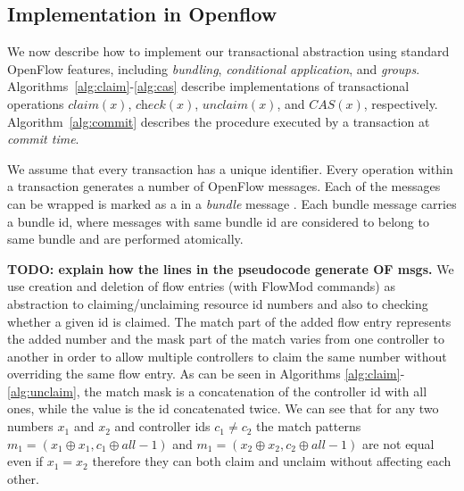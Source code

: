 \documentclass[conference]{sigcomm-alternate}
\newcommand{\concat}[0]{\oplus}
\begin{document}
\subsection{Implementation in Openflow}\label{sec:t-impl}

We now describe how to implement our transactional 
abstraction using standard OpenFlow features, including
\emph{bundling}, \emph{conditional application}, and \emph{groups}.
Algorithms~\ref{alg:claim}-\ref{alg:cas} describe implementations of  
transactional operations  $\textit{claim}(x)$, $\textit{check}(x)$, $\textit{unclaim}(x)$,
and $\textit{CAS}(x)$, respectively. 
Algorithm~\ref{alg:commit} describes the procedure executed by
a transaction at \emph{commit time}.

We assume that every transaction has a unique identifier. 
Every operation within a transaction generates a number of  OpenFlow
messages. Each of the messages can be wrapped 
is marked as a 
in a \emph{bundle} message
.
Each bundle message carries a bundle id, where messages with same bundle id are considered to belong to same bundle and are performed atomically.


  
\textbf{TODO: explain how the lines in the pseudocode generate OF msgs.} 
We use creation and deletion of flow entries (with FlowMod commands) as abstraction to claiming/unclaiming  resource id numbers and also to checking whether a given id is claimed. The match part of the added flow entry represents the added
number and the mask part of the match varies from one controller to another in order to allow multiple controllers to claim the same number without overriding the same flow entry. 
As can be seen in Algorithms \ref{alg:claim}-\ref{alg:unclaim}, the match mask is a concatenation of the controller id with all ones, while the value is the id concatenated twice. We can see that for any two numbers $x_1$ and $x_2$ and controller ids $c_1\neq c_2$ the match patterns $m_1=(x_1\concat x_1, c_1\concat all-1)$ and $ m_1=(x_2\concat x_2, c_2\concat all-1)$ are not equal even if $x_1=x_2$ therefore they can both claim and unclaim without affecting each other.
\end{document}
